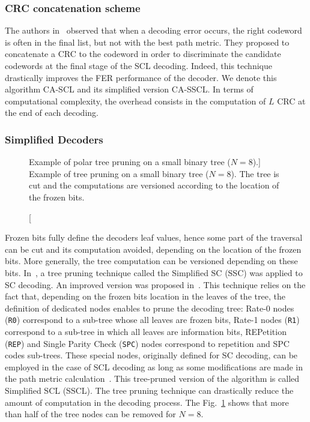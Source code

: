 \subsubsection{CRC concatenation scheme}

The authors in~\cite{Tal2011} observed that when a decoding error occurs, the
right codeword is often in the final list, but not with the best path metric.
They proposed to concatenate a CRC to the codeword in order to discriminate the
candidate codewords at the final stage of the SCL decoding. Indeed, this
technique drastically improves the FER performance of the decoder. We denote
this algorithm CA-SCL and its simplified version CA-SSCL. In terms of
computational complexity, the overhead consists in the computation of $L$ CRC at
the end of each decoding.

\subsubsection{Simplified Decoders}
\label{sec:alg_polar_simplified_decoders}

\begin{figure}[htp]
  \centering
  
  \caption
    [Example of polar tree pruning on a small binary tree ($N = 8$).]
    {Example of tree pruning on a small binary tree ($N = 8$). The tree is cut
    and the computations are versioned according to the location of the frozen
    bits.}
  \label{fig:tree_pruning_example}
\end{figure}

Frozen bits fully define the decoders leaf values, hence some part of the
traversal can be cut and its computation avoided, depending on the location of
the frozen bits. More generally, the tree computation can be versioned depending
on these bits. In~\cite{Alamdar-Yazdi2011}, a tree pruning technique called the
Simplified SC (SSC) was applied to SC decoding. An improved version was proposed
in~\cite{Sarkis2014a}. This technique relies on the fact that, depending on the
frozen bits location in the leaves of the tree, the definition of dedicated
nodes enables to prune the decoding tree: Rate-0 nodes (\verb|R0|) correspond to
a sub-tree whose all leaves are frozen bits, Rate-1 nodes (\verb|R1|) correspond
to a sub-tree in which all leaves are information bits, REPetition (\verb|REP|)
and Single Parity Check (\verb|SPC|) nodes correspond to repetition and SPC
codes sub-trees. These special nodes, originally defined for SC decoding, can be
employed in the case of SCL decoding as long as some modifications are made in
the path metric calculation~\cite{Sarkis2016}. This tree-pruned version of the
algorithm is called Simplified SCL (SSCL). The tree pruning technique can
drastically reduce the amount of computation in the decoding process. The
Fig.~\ref{fig:tree_pruning_example} shows that more than half of the tree nodes
can be removed for $N = 8$.

